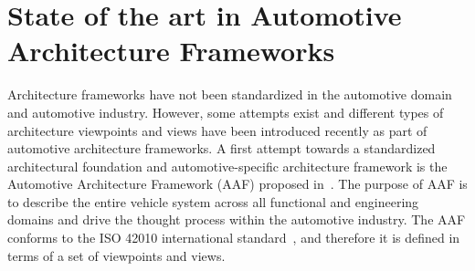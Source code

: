 \section{State of the art in Automotive Architecture Frameworks}\label{sec:automotiveAF}
Architecture frameworks have not been standardized in the automotive domain and automotive industry. 
However, some attempts exist and different types of architecture viewpoints and views have been introduced recently as part
of automotive architecture frameworks. 
A first attempt towards a standardized architectural foundation and automotive-specific
architecture framework is the Automotive
Architecture Framework (AAF) proposed in~\cite{Broy}. 
The purpose of AAF is to describe the entire vehicle system
across all functional and engineering domains and drive the thought process within the
automotive industry.
The AAF conforms to the ISO 42010 international standard~\cite{42010}, and therefore it is defined in terms of a set of viewpoints and views. 
%
%
%
%
%
